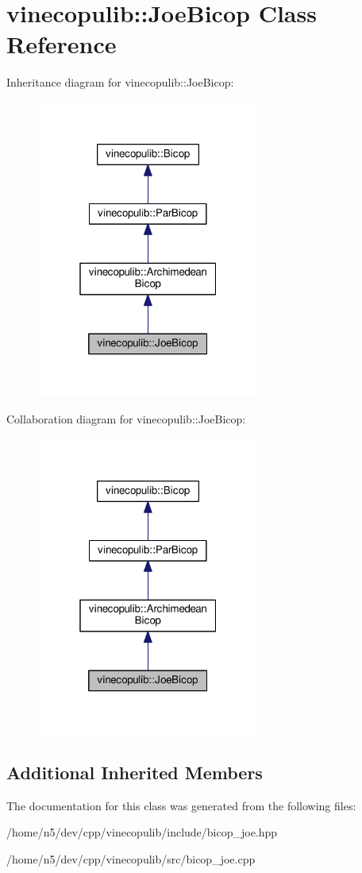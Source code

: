 \hypertarget{classvinecopulib_1_1_joe_bicop}{}\section{vinecopulib\+:\+:Joe\+Bicop Class Reference}
\label{classvinecopulib_1_1_joe_bicop}


Inheritance diagram for vinecopulib\+:\+:Joe\+Bicop\+:\nopagebreak
\begin{figure}[H]
\begin{center}
\leavevmode
\includegraphics[width=208pt]{classvinecopulib_1_1_joe_bicop__inherit__graph}
\end{center}
\end{figure}


Collaboration diagram for vinecopulib\+:\+:Joe\+Bicop\+:\nopagebreak
\begin{figure}[H]
\begin{center}
\leavevmode
\includegraphics[width=208pt]{classvinecopulib_1_1_joe_bicop__coll__graph}
\end{center}
\end{figure}
\subsection*{Additional Inherited Members}


The documentation for this class was generated from the following files\+:\begin{DoxyCompactItemize}
\item 
/home/n5/dev/cpp/vinecopulib/include/bicop\+\_\+joe.\+hpp\item 
/home/n5/dev/cpp/vinecopulib/src/bicop\+\_\+joe.\+cpp\end{DoxyCompactItemize}
